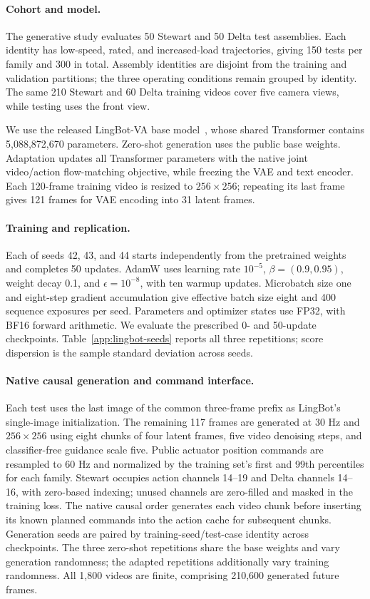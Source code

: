 \documentclass[10pt,twocolumn,letterpaper]{article}
\begin{document}
\paragraph{Cohort and model.}
The generative study evaluates 50 Stewart and 50 Delta test assemblies. Each identity has low-speed, rated, and increased-load trajectories, giving 150 tests per family and 300 in total. Assembly identities are disjoint from the training and validation partitions; the three operating conditions remain grouped by identity. The same 210 Stewart and 60 Delta training videos cover five camera views, while testing uses the front view.

We use the released LingBot-VA base model~\cite{li2026causal}, whose shared Transformer contains 5,088,872,670 parameters. Zero-shot generation uses the public base weights. Adaptation updates all Transformer parameters with the native joint video/action flow-matching objective, while freezing the VAE and text encoder. Each 120-frame training video is resized to $256\times256$; repeating its last frame gives 121 frames for VAE encoding into 31 latent frames.

\paragraph{Training and replication.}
Each of seeds 42, 43, and 44 starts independently from the pretrained weights and completes 50 updates. AdamW uses learning rate $10^{-5}$, $\beta=(0.9,0.95)$, weight decay 0.1, and $\epsilon=10^{-8}$, with ten warmup updates. Microbatch size one and eight-step gradient accumulation give effective batch size eight and 400 sequence exposures per seed. Parameters and optimizer states use FP32, with BF16 forward arithmetic. We evaluate the prescribed 0- and 50-update checkpoints. Table~\ref{app:lingbot-seeds} reports all three repetitions; score dispersion is the sample standard deviation across seeds.

\paragraph{Native causal generation and command interface.}
Each test uses the last image of the common three-frame prefix as LingBot's single-image initialization. The remaining 117 frames are generated at 30 Hz and $256\times256$ using eight chunks of four latent frames, five video denoising steps, and classifier-free guidance scale five. Public actuator position commands are resampled to 60 Hz and normalized by the training set's first and 99th percentiles for each family. Stewart occupies action channels 14--19 and Delta channels 14--16, with zero-based indexing; unused channels are zero-filled and masked in the training loss. The native causal order generates each video chunk before inserting its known planned commands into the action cache for subsequent chunks. Generation seeds are paired by training-seed/test-case identity across checkpoints. The three zero-shot repetitions share the base weights and vary generation randomness; the adapted repetitions additionally vary training randomness. All 1,800 videos are finite, comprising 210,600 generated future frames.
\end{document}
